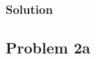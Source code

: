 \documentclass[conf]{new-aiaa}
\begin{document}
\begin{center}
	 \\
\end{center}


\subsubsection*{Solution} 





\subsection*{Problem 2a} 

\begin{center}
	 \\
\end{center}
\end{document}
